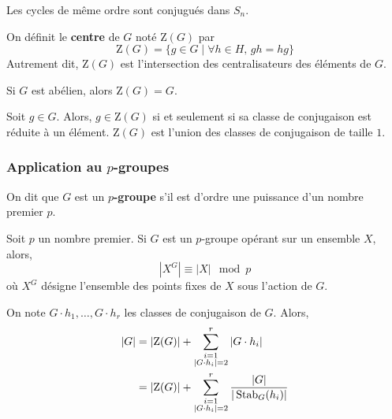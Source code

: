 	\begin{example}
		Les cycles de même ordre sont conjugués dans $S_n$.
	\end{example}
	
	
	\begin{definition}
		On définit le \textbf{centre} de $G$ noté $\mathrm{Z}(G)$ par
		\[ \mathrm{Z}(G) = \{ g \in G \mid \forall h \in H, \, gh=hg \} \]
		Autrement dit, $\mathrm{Z}(G)$ est l'intersection des centralisateurs des éléments de $G$.
	\end{definition}
	
	\begin{example}
		Si $G$ est abélien, alors $\mathrm{Z}(G) = G$.
	\end{example}
	
	
	\begin{proposition}
		Soit $g \in G$. Alors, $g \in \mathrm{Z}(G)$ si et seulement si sa classe de conjugaison est réduite à un élément.
		\newpar
		$\mathrm{Z}(G)$ est l'union des classes de conjugaison de taille $1$.
	\end{proposition}
	
	\subsubsection{Application au \texorpdfstring{$p$}{p}-groupes}
	
	\reference[ROM21]{22}
	
	\begin{definition}
		On dit que $G$ est un \textbf{$p$-groupe} s'il est d'ordre une puissance d'un nombre premier $p$.
	\end{definition}
	
	\begin{proposition}
		Soit $p$ un nombre premier. Si $G$ est un $p$-groupe opérant sur un ensemble $X$, alors,
		\[ |X^G| \equiv |X| \mod p \]
		où $X^G$ désigne l'ensemble des points fixes de $X$ sous l'action de $G$.
	\end{proposition}
	
	\begin{corollary}
		On note $G \cdot h_1, \dots, G \cdot h_r$ les classes de conjugaison de $G$. Alors,
		\begin{align*}
			\vert G \vert &= \vert \mathrm{Z}(G) \vert + \sum_{\substack{i=1 \\ \vert G \cdot h_i \vert = 2}}^{r} \vert G \cdot h_i \vert \\
			&= \vert \mathrm{Z}(G) \vert + \sum_{\substack{i=1 \\ \vert G \cdot h_i \vert = 2}}^{r} \frac{\vert G \vert}{\vert \operatorname{Stab}_G(h_i) \vert}
		\end{align*}
	\end{corollary}
	
